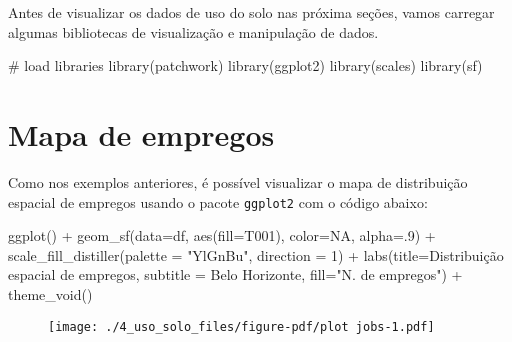 \documentclass[
  letterpaper,
  DIV=11,
  numbers=noendperiod]{scrreprt}
\newenvironment{Shaded}{\begin{snugshade}}{\end{snugshade}}
\newcommand{\AttributeTok}[1]{\textcolor[rgb]{0.40,0.45,0.13}{#1}}
\newcommand{\CommentTok}[1]{\textcolor[rgb]{0.37,0.37,0.37}{#1}}
\newcommand{\ConstantTok}[1]{\textcolor[rgb]{0.56,0.35,0.01}{#1}}
\newcommand{\DecValTok}[1]{\textcolor[rgb]{0.68,0.00,0.00}{#1}}
\newcommand{\FunctionTok}[1]{\textcolor[rgb]{0.28,0.35,0.67}{#1}}
\newcommand{\NormalTok}[1]{\textcolor[rgb]{0.00,0.23,0.31}{#1}}
\newcommand{\SpecialCharTok}[1]{\textcolor[rgb]{0.37,0.37,0.37}{#1}}
\newcommand{\StringTok}[1]{\textcolor[rgb]{0.13,0.47,0.30}{#1}}
\begin{document}
Antes de visualizar os dados de uso do solo nas próxima seções, vamos
carregar algumas bibliotecas de visualização e manipulação de dados.

\begin{Shaded}
\begin{Highlighting}[]
\CommentTok{\# load libraries}
\FunctionTok{library}\NormalTok{(patchwork)}
\FunctionTok{library}\NormalTok{(ggplot2)}
\FunctionTok{library}\NormalTok{(scales)}
\FunctionTok{library}\NormalTok{(sf)}
\end{Highlighting}
\end{Shaded}

\hypertarget{mapa-de-empregos}{%
\section{Mapa de empregos}\label{mapa-de-empregos}}

Como nos exemplos anteriores, é possível visualizar o mapa de
distribuição espacial de empregos usando o pacote \texttt{ggplot2} com o
código abaixo:

\begin{Shaded}
\begin{Highlighting}[]
\FunctionTok{ggplot}\NormalTok{() }\SpecialCharTok{+}
  \FunctionTok{geom\_sf}\NormalTok{(}\AttributeTok{data=}\NormalTok{df, }\FunctionTok{aes}\NormalTok{(}\AttributeTok{fill=}\NormalTok{T001), }\AttributeTok{color=}\ConstantTok{NA}\NormalTok{, }\AttributeTok{alpha=}\NormalTok{.}\DecValTok{9}\NormalTok{) }\SpecialCharTok{+}
  \FunctionTok{scale\_fill\_distiller}\NormalTok{(}\AttributeTok{palette =} \StringTok{"YlGnBu"}\NormalTok{, }\AttributeTok{direction =} \DecValTok{1}\NormalTok{) }\SpecialCharTok{+}
  \FunctionTok{labs}\NormalTok{(}\AttributeTok{title=}\StringTok{\textquotesingle{}Distribuição espacial de empregos\textquotesingle{}}\NormalTok{, }
       \AttributeTok{subtitle =} \StringTok{\textquotesingle{}Belo Horizonte\textquotesingle{}}\NormalTok{, }\AttributeTok{fill=}\StringTok{"N. de empregos"}\NormalTok{) }\SpecialCharTok{+}
  \FunctionTok{theme\_void}\NormalTok{()}
\end{Highlighting}
\end{Shaded}

\begin{figure}[H]

{\centering \texttt{[image: ./4\_uso\_solo\_files/figure-pdf/plot jobs-1.pdf]}

}

\end{figure}
\end{document}
